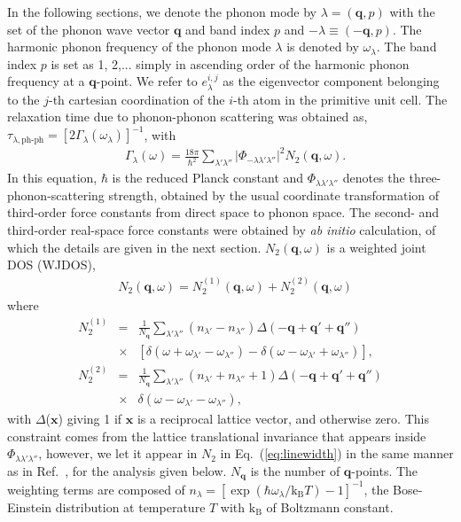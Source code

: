 \documentclass[twocolumn,amsmath,amssymb,a4paper,prb,superscriptaddress,floatfix]{revtex4-1}
\begin{document}
In the following sections, we denote the phonon mode by $\lambda=(\mathbf{q},p)$
with the set of the phonon wave vector $\mathbf{q}$ and band index $p$ and
$-\lambda \equiv (-\mathbf{q},p)$.  The harmonic phonon frequency of the phonon
mode $\lambda$ is denoted by  $\omega_\lambda$.  The band index $p$ is set as 1,
2,... simply in ascending order of the harmonic phonon frequency at a
$\mathbf{q}$-point.  We refer to $e_\lambda^{i,j}$ as the eigenvector
component belonging to the $j$-th cartesian coordination of the $i$-th atom in
the primitive unit cell.  The relaxation time due to phonon-phonon scattering
was obtained as,
$\tau_{\lambda,\text{ph-ph}}=[2\Gamma_\lambda(\omega_\lambda)]^{-1}$, with
\begin{align}
 \label{eq:linewidth}
 &\Gamma_\lambda(\omega) = \frac{18\pi}{\hbar^2}
  \sum_{\lambda' \lambda''}
  \bigl|\Phi_{-\lambda\lambda'\lambda''}\bigl|^2 N_2(\mathbf{q},\omega).
\end{align}
In this equation, $\hbar$ is the reduced Planck constant and
$\Phi_{\lambda\lambda'\lambda''}$ denotes the three-phonon-scattering strength,
obtained by the usual coordinate transformation of third-order force constants
from direct space to phonon space.\cite{phono3py} The second- and third-order
real-space force constants were obtained by {\it ab initio} calculation, of
which the details are given in the next section. $N_2(\mathbf{q},\omega)$ is a
weighted joint DOS (WJDOS)\cite{phono3py},
\begin{align}
 \label{eq:jdos}
 &N_2(\mathbf{q},\omega) = N_2^{(1)}(\mathbf{q},\omega) +  N_2^{(2)}(\mathbf{q},\omega)
\end{align}
where 
\begin{eqnarray*}
	N_2^{(1)} & = & \frac{1}{N_\mathbf{q}} \sum_{\lambda'\lambda''}(n_{\lambda'}-n_{\lambda''})\Delta(-\mathbf{q} + \mathbf{q'} + \mathbf{q''}) \nonumber \\
								   & \times & [\delta(\omega + \omega_{\lambda'} - \omega_{\lambda''}) - \delta(\omega - \omega_{\lambda'} + \omega_{\lambda''})],\\
	N_2^{(2)} & = & \frac{1}{N_\mathbf{q}} \sum_{\lambda'\lambda''}(n_{\lambda'} + n_{\lambda''}+1)\Delta(-\mathbf{q} + \mathbf{q'} + \mathbf{q''}) \nonumber \\
								   & \times & \delta(\omega - \omega_{\lambda'} - \omega_{\lambda''}),
\end{eqnarray*}
with $\Delta$($\mathbf{x}$) giving 1 if $\mathbf{x}$ is a reciprocal lattice
vector, and otherwise zero. This constraint comes from the lattice
translational invariance that appears inside
$\Phi_{\lambda\lambda'\lambda''}$,\cite{phono3py} however, we let it appear in
$N_2$ in Eq.~(\ref{eq:linewidth}) in the same manner as in
Ref.~, for the analysis given below. $N_\mathbf{q}$
is the number of $\mathbf{q}$-points. The weighting terms are composed of
$n_\lambda=[\exp(\hbar\omega_\lambda/\mathrm{k_B}T)-1]^{-1}$, the Bose-Einstein
distribution at temperature $T$ with $\mathrm{k_B}$ of Boltzmann constant.
\end{document}
